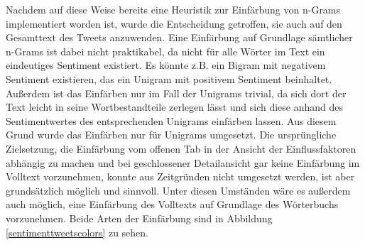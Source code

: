 Nachdem auf diese Weise bereits eine Heuristik zur Einfärbung von n-Grams implementiert worden ist, wurde die Entscheidung getroffen, sie auch auf den Gesamttext des Tweets anzuwenden. Eine Einfärbung auf Grundlage sämtlicher n-Grams ist dabei nicht praktikabel, da nicht für alle Wörter im Text ein eindeutiges Sentiment existiert. Es könnte z.B. ein Bigram mit negativem Sentiment existieren, das ein Unigram mit positivem Sentiment beinhaltet. Außerdem ist das Einfärben nur im Fall der Unigrams trivial, da sich dort der Text leicht in seine Wortbestandteile zerlegen lässt und sich diese anhand des Sentimentwertes des entsprechenden Unigrams einfärben lassen. Aus diesem Grund wurde das Einfärben nur für Unigrams umgesetzt. Die ursprüngliche Zielsetzung, die Einfärbung vom offenen Tab in der Ansicht der Einflussfaktoren abhängig zu machen und bei geschlossener Detailansicht gar keine Einfärbung im Volltext vorzunehmen, konnte aus Zeitgründen nicht umgesetzt werden, ist aber grundsätzlich möglich und sinnvoll. Unter diesen Umständen wäre es außerdem auch möglich, eine Einfärbung des Volltexts auf Grundlage des Wörterbuchs vorzunehmen. Beide Arten der Einfärbung sind in Abbildung \ref{sentimenttweetscolors} zu sehen.


